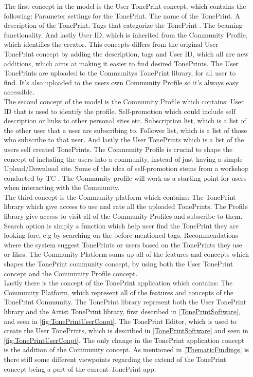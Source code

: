 The first concept in the model is the User TonePrint concept, which contains the following: Parameter settings for the TonePrint. The name of the TonePrint. A description of the TonePrint. Tags that categorize the TonePrint . The beaming functionality. And lastly User ID, which is inherited from the Community Profile, which identifies the creator. This concepts differs from the original User TonePrint concept by adding the description, tags and User ID, which all are new additions, which aims at making it easier to find desired TonePrints. The User TonePrints are uploaded to the Communitys TonePrint library, for all user to find. It's also uploaded to the users own Community Profile so it's always easy accessible.\\
The second concept of the model is the Community Profile which contains: User ID that is used to identify the profile. Self-promotion which could include self description or links to other personal sites etc. Subscription list, which is a list of the other user that a user are subscribing to. Follower list, which is a list of those who subscribe to that user. And lastly the User TonePrints which is a list of the users self created TonePrints. The Community Profile is crucial to shape the concept of including the users into a community, instead of just having a simple Upload/Download site. Some of the idea of self-promotion stems from a workshop conducted by TC \parencite{PDF:BrugerWorkshopUserTonePrints}. The Community profile will work as a starting point for users when interacting with the Community.\\
The third concept is the Community platform which contains: The TonePrint library which give access to use and rate all the uploaded TonePrints. The Profile library give access to visit all of the Community Profiles and subscribe to them. Search option is simply a function which help user find the TonePrint they are looking fore, e.g by searching on the before mentioned tags. Recommendations where the system suggest TonePrints or users based on the TonePrints they use or likes. The Community Platform sums up all of the features and concepts which shapes the TonePrint community concept, by using both the User TonePrint concept and the Community Profile concept.\\
Lastly there is the concept of the TonePrint application which contains: The Community Platform, which represent all of the features and concepts of the TonePrint Community. The TonePrint library represent both the User TonePrint library and the Artist TonePrint library, first described in \autoref{TonePrintSoftware}, and seen in \autoref{fig:TonePrintUserConpt}. The TonePrint Editor, which is used to create the User TonePrints, which is described in \autoref{TonePrintSoftware} and seen in \autoref{fig:TonePrintUserConpt}. The only change in the TonePrint application concept is the addition of the Community concept. As mentioned in \autoref{ThematicFindings} is there still some different viewpoints regarding the extend of the TonePrint concept being a part of the current TonePrint app. 

